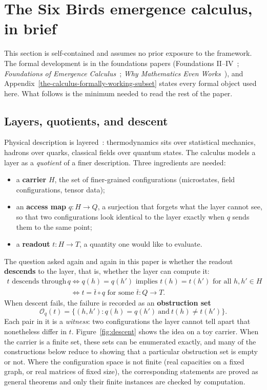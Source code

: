 \documentclass[11pt]{article}
\theoremstyle{definition}
\providecommand{\tightlist}{\setlength{\itemsep}{0pt}\setlength{\parskip}{0pt}}
\begin{document}
 \section{The Six Birds emergence calculus, in brief}\label{the-six-birds-emergence-calculus-in-brief}

This section is self-contained and assumes no prior exposure to the framework. The formal development is in the
foundations papers (Foundations II--IV~\citep{Tsiokos_FoundationsII,Tsiokos_FoundationsIII,Tsiokos_FoundationsIV};
\emph{Foundations of Emergence Calculus}~\citep{Tsiokos_FoEC}; \emph{Why Mathematics Even Works}~\citep{Tsiokos_WhyMath}),
and Appendix~\ref{the-calculus-formally-working-subset} states every formal object used here. What follows is the
minimum needed to read the rest of the paper.

\subsection{Layers, quotients, and descent}\label{layers-quotients-and-descent}

Physical description is layered~\citep{Anderson1972}: thermodynamics sits over statistical mechanics, hadrons over
quarks, classical fields over quantum states. The calculus models a layer as a \emph{quotient} of a finer description.
Three ingredients are needed:

\begin{itemize}\tightlist
\item a \textbf{carrier} \(H\), the set of finer-grained configurations (microstates, field configurations, tensor data);
\item an \textbf{access map} \(q:H\to Q\), a surjection that forgets what the layer cannot see, so that two
  configurations look identical to the layer exactly when \(q\) sends them to the same point;
\item a \textbf{readout} \(t:H\to T\), a quantity one would like to evaluate.
\end{itemize}

The question asked again and again in this paper is whether the readout \textbf{descends} to the layer, that is,
whether the layer can compute it:
\begin{align*}
t \text{ descends through } q
&\iff q(h)=q(h') \text{ implies } t(h)=t(h') \text{ for all } h,h'\in H\\
&\iff t=\bar t\circ q \text{ for some } \bar t:Q\to T .
\end{align*}
When descent fails, the failure is recorded as an \textbf{obstruction set}
\[
\mathcal O_q(t)=\{(h,h') : q(h)=q(h')\ \text{and}\ t(h)\neq t(h')\}.
\]
Each pair in it is a \emph{witness}: two configurations the layer cannot tell apart that nonetheless differ in \(t\).
Figure~\ref{fig:descent} shows the idea on a toy carrier. When the carrier is a finite set, these sets can be enumerated exactly, and many of the constructions below reduce
to showing that a particular obstruction set is empty or not. Where the configuration space is not finite (real
capacities on a fixed graph, or real matrices of fixed size), the corresponding statements are proved as general
theorems and only their finite instances are checked by computation.
\end{document}
